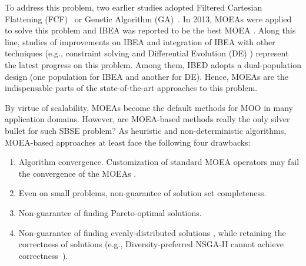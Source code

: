 %

To address this problem, two earlier studies adopted Filtered Cartesian Flattening (FCF)~\cite{DBLP:journals/jss/WhiteDS09} or Genetic Algorithm (GA)~\cite{DBLP:journals/jss/GuoWWLW11}. In 2013, MOEAs were applied to solve this problem and IBEA was reported to be the best MOEA \cite{DBLP:conf/icse/SayyadMA13}. Along this line, studies of improvements on IBEA \cite{DBLP:dblp_conf/kbse/SayyadIMA13}\cite{DBLP:conf/issta/TanXCSLD15} and integration of IBEA with other techniques (e.g., constraint solving \cite{DBLP:conf/icse/HenardPHT15} and Differential Evolution (DE) \cite{DBLP:journals/asc/XueZT0CC016}) represent the latest progress on this problem. Among them, IBED \cite{DBLP:journals/asc/XueZT0CC016} adopts a dual-population design (one population for IBEA and another for DE).%
Hence, MOEAs are the indispensable parts of the state-of-the-art approaches to this problem.



By virtue of scalability, MOEAs become the default methods for MOO in many application domains. However, are MOEA-based methods really the only silver bullet for such SBSE problem? As heuristic and non-deterministic algorithms,  MOEA-based approaches at least face the following four drawbacks:

\begin{enumerate}[itemsep=0mm]
\item  Algorithm convergence. Customization of standard MOEA operators may fail the convergence of the MOEAs \cite{DBLP:journals/ec/LaumannsTDZ02}.
\item  Even on small problems, non-guarantee of solution set completeness.
\item  Non-guarantee of finding Pareto-optimal solutions.
\item  Non-guarantee of finding evenly-distributed solutions \cite{DBLP:journals/ec/LaumannsTDZ02}, while retaining the correctness of solutions (e.g., Diversity-preferred NSGA-II cannot achieve correctness~\cite{DBLP:conf/icse/SayyadMA13}).  %
\end{enumerate}

